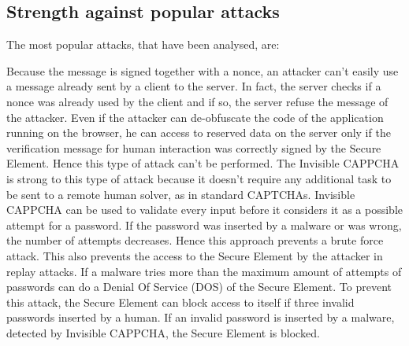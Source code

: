 \subsection{Strength against popular attacks}
The most popular attacks, that have been analysed, are\cite{Invisible_CAPPCHA}:
\begin{itemize}
{Because the message is signed together with a nonce, an attacker can't easily use a message already sent by a client to the server. In fact, the server checks if a nonce was already used by the client and if so, the server refuse the message of the attacker.
}
{Even if the attacker can de-obfuscate the code of the application running on the browser, he can access to reserved data on the server only if the verification message for human interaction was correctly signed by the Secure Element. Hence this type of attack can't be performed.}
{The Invisible CAPPCHA is strong to this type of attack because it doesn't require any additional task to be sent to a remote human solver, as in standard CAPTCHAs.}
{Invisible CAPPCHA can be used to validate every input before it considers it as a possible attempt for a password. If the password was inserted by a malware or was wrong, the number of attempts decreases. Hence this approach prevents a brute force attack. This also prevents the access to the Secure Element by the attacker in replay attacks.
}
{If a malware tries more than the maximum amount of attempts of passwords can do a Denial Of Service (DOS) of the Secure Element. To prevent this attack, the Secure Element can block access to itself if three invalid passwords inserted by a human. If an invalid password is inserted by a malware, detected by Invisible CAPPCHA, the Secure Element is blocked.}
\end{itemize}